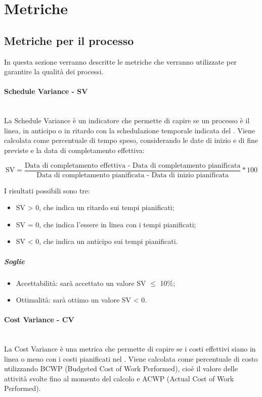 \pagebreak
\section{Metriche}
\label{AppB:metric}
\subsection{Metriche per il processo}
\label{AppB:metricheProc}
In questa sezione verranno descritte le metriche che verranno utilizzate per garantire la qualità dei processi.

\paragraph{Schedule Variance - SV}
\label{AppB:SV}
	~\\La Schedule Variance è un indicatore che permette di capire se un processo è il linea, in anticipo o in ritardo con la schedulazione temporale indicata del \PdP{}. Viene calcolata come percentuale di tempo speso, considerando le date di inizio e di fine previste e la data di completamento effettiva:
	
	\begin{displaymath}
\mbox{SV}= \frac{\mbox{Data di completamento effettiva - Data di completamento pianificata}} {\mbox{Data di completamento pianificata - Data di inizio pianificata}} * 100
\end{displaymath}

I risultati possibili sono tre:

\begin{itemize}
\item SV > 0, che indica un ritardo sui tempi pianificati;
\item SV = 0, che indica l'essere in linea con i tempi pianificati;
\item SV < 0, che indica un anticipo sui tempi pianificati.
\end{itemize}

\subparagraph{Soglie}
\begin{itemize}
\item Accettabilità: sarà accettato un valore SV $\le$ 10\%;
\item Ottimalità: sarà ottimo un valore SV < 0.
\end{itemize}
	
\paragraph{Cost Variance - CV}
\label{AppB:CV}
	~\\La Cost Variance è una metrica che permette di capire se i costi effettivi siano in linea o meno con i costi pianificati nel \PdP{}. Viene calcolata come percentuale di costo utilizzando BCWP (Budgeted Cost of Work Performed), cioè il valore delle attività svolte fino al momento del calcolo e ACWP (Actual Cost of Work Performed).
	
